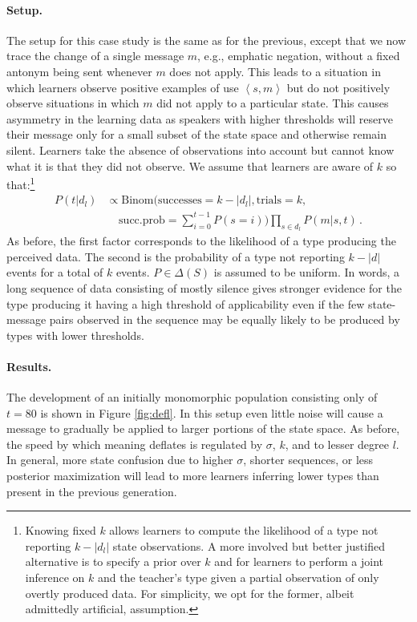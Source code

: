 \documentclass[10pt,a4paper]{article}
\newcommand{\tuple}[1]{\ensuremath{\left\langle #1 \right\rangle}}
\begin{document}
\paragraph{Setup.} The setup for this case study is the same as for the previous, except that
we now trace the change of a single message $m$, e.g., emphatic negation, without a fixed
antonym being sent whenever $m$ does not apply. This leads to a situation in which learners
observe positive examples of use $\tuple{s,m}$ but do not positively observe situations in
which $m$ did not apply to a particular state. This causes asymmetry in the learning data
as speakers with higher thresholds will reserve their message only for a small subset of the
state space and otherwise remain silent. Learners take the absence of observations into account
but cannot know what it is that they did not observe. We assume that learners
are aware of $k$ so that:\footnote{Knowing fixed $k$ allows learners to compute the likelihood
  of a type not reporting $k -|d_l|$ state observations. A more involved but better justified
  alternative is to specify a prior over $k$ and for learners to perform a joint inference on
  $k$ and the teacher's type given a partial observation of only overtly produced data. For
  simplicity, we opt for the former, albeit admittedly artificial, assumption.}
\begin{align*}
  P(t | d_l) & \propto \text{Binom}(\text{successes} =
  k-|d_l|, \text{trials} = k, \\
  & 
  \ \ \ \ \ \text{succ.prob} = \sum_{i=0}^{t-1} P(s = i)) \prod_{s \in d_l} P(m|s,t)\,.
\end{align*}
As before, the first factor corresponds to the
likelihood of a type producing the perceived data.  The second is the probability of a type not
reporting $k-|d|$ events for a total of $k$ events. $P \in \Delta(S)$ is assumed to be
uniform. In words, a long sequence of data consisting of mostly silence gives stronger evidence
for the type producing it having a high threshold of applicability even if the few state-message pairs observed in
the sequence may be equally likely to be produced by types with lower thresholds.

\paragraph{Results.} The development of an initially monomorphic population consisting only of
$t = 80$ is shown in Figure \ref{fig:defl}. In this setup even little noise will cause a
message to gradually be applied to larger portions of the state space. As before, the speed by
which meaning deflates is regulated by $\sigma$, $k$, and to lesser degree $l$. In general,
more state confusion due to higher $\sigma$, shorter sequences, or less posterior maximization
will lead to more learners inferring lower types than present in the previous generation.
\end{document}
